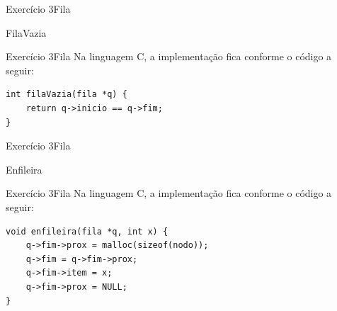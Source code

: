 \documentclass[aspectratio=169]{beamer}
\begin{document}
\begin{frame}[fragile]{Exercício 3}{Fila}
\begin{algorithm}[H]
\caption{FilaVazia} 
\label{FilaVazia}
\end{algorithm}
\end{frame}


\begin{frame}[fragile]{Exercício 3}{Fila}
Na linguagem C, a implementação fica conforme o código a seguir:
\begin{lstlisting}[style=CStyle]
int filaVazia(fila *q) {
    return q->inicio == q->fim;
}
\end{lstlisting}  
\end{frame}


\begin{frame}[fragile]{Exercício 3}{Fila}
\begin{algorithm}[H]
\caption{Enfileira} 
\label{Enfileira}
\end{algorithm}
\end{frame}


\begin{frame}[fragile]{Exercício 3}{Fila}
Na linguagem C, a implementação fica conforme o código a seguir:
\begin{lstlisting}[style=CStyle]
void enfileira(fila *q, int x) {
    q->fim->prox = malloc(sizeof(nodo));
    q->fim = q->fim->prox;
    q->fim->item = x;
    q->fim->prox = NULL;
}
\end{lstlisting}  
\end{frame}
\end{document}
